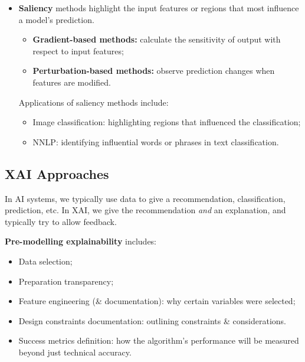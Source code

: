 \documentclass[a4paper,11pt]{article}
\begin{document}
\begin{itemize}
    \item   \textbf{Saliency} methods highlight the input features or regions that most influence a model's prediction.
            \begin{itemize}
                \item   \textbf{Gradient-based methods:} calculate the sensitivity of output with respect to input features;
                \item   \textbf{Perturbation-based methods:} observe prediction changes when features are modified.
            \end{itemize}

            Applications of saliency methods include:
            \begin{itemize}
                \item   Image classification: highlighting regions that influenced the classification;
                \item   NNLP: identifying influential words or phrases in text classification.
            \end{itemize}
\end{itemize}

\subsection{XAI Approaches}
In AI systems, we typically use data to give a recommendation, classification, prediction, etc.
In XAI, we give the recommendation \textit{and} an explanation, and typically try to allow feedback.

\textbf{Pre-modelling explainability} includes:
\begin{itemize}
    \item   Data selection;
    \item   Preparation transparency;
    \item   Feature engineering (\& documentation): why certain variables were selected;
    \item   Design constraints documentation: outlining constraints \& considerations.
    \item   Success metrics definition: how the algorithm's performance will be measured beyond just technical accuracy.
\end{itemize}
\end{document}
